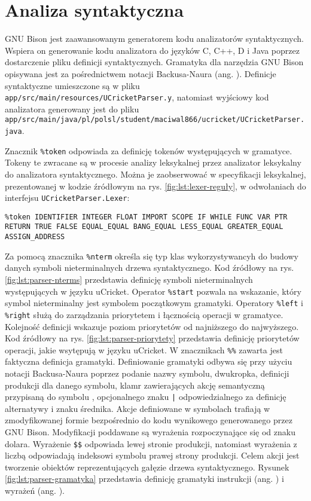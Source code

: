 \section{Analiza syntaktyczna}
GNU Bison  \cite{BisonGNUProject} jest zaawansowanym generatorem kodu analizatorów syntaktycznych. Wspiera on generowanie kodu analizatora do języków C, C++, D i Java poprzez dostarczenie pliku definicji syntaktycznych. Gramatyka dla narzędzia GNU Bison opisywana jest za pośrednictwem notacji Backusa-Naura (ang. ). Definicje syntaktyczne umieszczone są w pliku \lstinline|app/src/main/resources/UCricketParser.y|, natomiast wyjściowy kod analizatora generowany jest do pliku \lstinline|app/src/main/java/pl/polsl/student/maciwal866/ucricket/UCricketParser.java|.

Znacznik \lstinline|%token| odpowiada za definicję tokenów występujących w gramatyce. Tokeny te zwracane są w procesie analizy leksykalnej przez analizator leksykalny do analizatora syntaktycznego. Można je zaobserwować w specyfikacji leksykalnej, prezentowanej w kodzie źródłowym na rys. \ref{fig:lst:lexer-reguły}, w odwołaniach do interfejsu \lstinline|UCricketParser.Lexer|:
\begin{lstlisting}
%token IDENTIFIER INTEGER FLOAT IMPORT SCOPE IF WHILE FUNC VAR PTR RETURN TRUE FALSE EQUAL_EQUAL BANG_EQUAL LESS_EQUAL GREATER_EQUAL ASSIGN_ADDRESS
\end{lstlisting} 
Za pomocą znacznika \lstinline|%nterm| określa się typ klas wykorzystywancyh do budowy danych symboli nieterminalnych drzewa syntaktycznego. Kod źródłowy na rys. \ref{fig:lst:parser-nterms} przedstawia definicję symboli nieterminalnych występujących w języku uCricket.
Operator \lstinline|%start| pozwala na wskazanie, który symbol nieterminalny jest symbolem początkowym gramatyki.
Operatory \lstinline|%left| i \lstinline|%right| służą do zarządzania priorytetem i łącznością operacji w gramatyce. Kolejność definicji wskazuje poziom priorytetów od najniższego do najwyższego. Kod źródłowy na rys. \ref{fig:lst:parser-priorytety} przedstawia definicję priorytetów operacji, jakie wsytępują w języku uCricket.
W znacznikach \lstinline|%%| zawarta jest faktyczna definicja gramatyki. Definiowanie gramatyki odbywa się przy użyciu notacji Backusa-Naura poprzez podanie nazwy symbolu, dwukropka, definicji produkcji dla danego symbolu, klamr zawierających akcję semantyczną przypisaną do symbolu , opcjonalnego znaku \lstinline/|/ odpowiedzialnego za definicję alternatywy i znaku średnika. Akcje definiowane w symbolach trafiają w zmodyfikowanej formie bezpośrednio do kodu wynikowego generowanego przez GNU Bison. Modyfikacji poddawane są wyrażenia rozpoczynające się od znaku dolara. Wyrażenie \lstinline|$$| odpowiada lewej stronie produkcji, natomiast wyrażenia z liczbą odpowiadają indeksowi symbolu prawej strony produkcji. Celem akcji jest tworzenie obiektów reprezentujących gałęzie drzewa syntaktycznego. Rysunek \ref{fig:lst:parser-gramatyka} przedstawia definicję gramatyki instrukcji (ang. ) i wyrażeń (ang. ).
